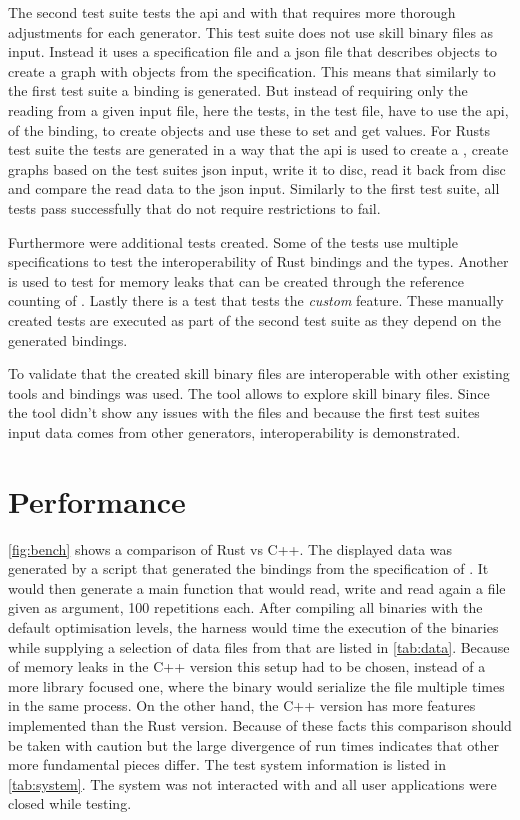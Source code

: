 \documentclass[thesis]{subfiles}
\begin{document}
  The second test suite tests the \gls{api} and with that requires more thorough adjustments for each generator.
  This test suite does not use \gls{skill} binary files as input.
  Instead it uses a specification file and a \gls{json} file that describes objects to create a graph with objects from the specification.
  This means that similarly to the first test suite a binding is generated.
  But instead of requiring only the reading from a given input file, here the tests, in the test file, have to use the \gls{api}, of the binding, to create objects and use these to set and get values.
  For Rusts test suite the tests are generated in a way that the \gls{api} is used to create a \SkillFile, create graphs based on the test suites \gls{json} input, write it to disc, read it back from disc and compare the read data to the \gls{json} input.
  Similarly to the first test suite, all tests pass successfully that do not require restrictions to fail.%

  Furthermore were additional tests created.
  Some of the tests use multiple specifications to test the interoperability of Rust bindings and the \Foreign types.
  Another is used to test for memory leaks that can be created through the reference counting of \PtrT.
  Lastly there is a test that tests the \emph{custom} feature.
  These manually created tests are executed as part of the second test suite as they depend on the generated bindings.

  To validate that the created \gls{skill} binary files are interoperable with other existing tools and bindings \autocite{skill-view} was used.
  The tool allows to explore \gls{skill} binary files.
  Since the tool didn't show any issues with the files and because the first test suites input data comes from other generators, interoperability is demonstrated.

\section{Performance}
  \autoref{fig:bench} shows a comparison of Rust vs C++.
  The displayed data was generated by a script that generated the bindings from the specification of \autocite{skill-llvm}.
  It would then generate a main function that would read, write and read again a file given as argument, 100 repetitions each.
  After compiling all binaries with the default optimisation levels, the harness would time the execution of the binaries while supplying a selection of data files from \autocite{skill-llvm} that are listed in \autoref{tab:data}.
  Because of memory leaks in the C++ version this setup had to be chosen, instead of a more library focused one, where the binary would serialize the file multiple times in the same process.
  On the other hand, the C++ version has more features implemented than the Rust version.
  Because of these facts this comparison should be taken with caution but the large divergence of run times indicates that other more fundamental pieces differ.
  The test system information is listed in \autoref{tab:system}.
  The system was not interacted with and all user applications were closed while testing.
\end{document}
